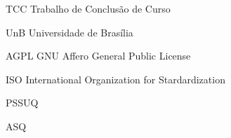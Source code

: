 \begin{siglas}
   
  \item[TCC] Trabalho de Conclusão de Curso
  \item[UnB] Universidade de Brasília
  \item[AGPL] GNU Affero General Public License
  \item[ISO] International Organization for Stardardization
  \item[PSSUQ]
  \item[ASQ]
  
\end{siglas}
